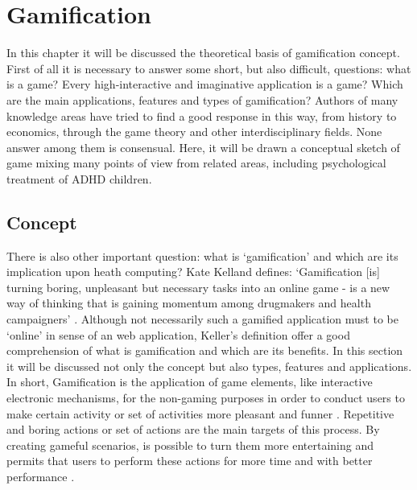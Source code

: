 \chapter{Gamification}
\label{ch:gamification}


In this chapter it will be discussed the theoretical basis of gamification concept. First of all it is necessary to answer some short, but also difficult, questions: what is a game? Every high-interactive and imaginative application is a game? Which are the main applications, features and types of gamification? Authors of many knowledge areas have tried to find a good response in this way, from history to economics, through the game theory and other interdisciplinary fields. None answer among them is consensual. Here, it will be drawn a conceptual sketch of game mixing many points of view from related areas, including psychological treatment of ADHD children.


\section{Concept}

There is also other important question: what is `gamification' and which are its implication upon heath computing? Kate Kelland defines: `Gamification [is] turning boring, unpleasant but necessary tasks into an online game - is a new way of thinking that is gaining momentum among drugmakers and health campaigners' \citep{gamehealth}. Although not necessarily such a gamified application must to be `online' in sense of an web application, Keller's definition offer a good comprehension of what is gamification and which are its benefits. In this section it will be discussed not only the concept but also types, features and applications. In short, Gamification is the application of game elements, like interactive electronic mechanisms, for the non-gaming purposes in order to conduct users to make certain activity or set of activities more pleasant and funner \citep{2212883,Huotari,Zich}. Repetitive and boring actions or set of actions are the main targets of this process. By creating gameful scenarios, is possible to turn them more entertaining and permits that users to perform these actions for more time and with better performance  \citep{2212883,Huotari}. 

